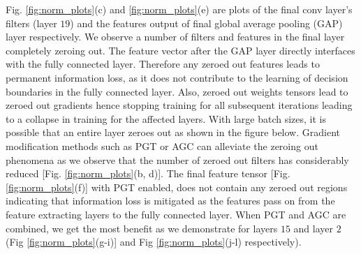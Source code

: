 \documentclass[runningheads]{llncs}
\begin{document}
Fig. \ref{fig:norm_plots}(c) and \ref{fig:norm_plots}(e) are plots of the final conv
layer's filters (layer $19$) and the features output of final global average pooling
(GAP) layer respectively. We observe a number of filters and features in the final layer
completely zeroing out. The feature vector after the GAP layer directly interfaces with
the fully connected layer. Therefore any zeroed out features leads to permanent
information loss, as it does not contribute to the learning of decision boundaries in
the fully connected layer. Also, zeroed out weights tensors lead to zeroed out gradients
hence stopping training for all subsequent iterations leading to a collapse in training
for the affected layers. With large batch sizes, it is possible that an entire layer
zeroes out as shown in the figure below. Gradient modification methods such as PGT or
AGC can alleviate the zeroing out phenomena as we observe that the number of zeroed out
filters has considerably reduced [Fig. \ref{fig:norm_plots}(b, d)]. The final feature
tensor [Fig. \ref{fig:norm_plots}(f)] with PGT enabled, does not contain any zeroed out
regions indicating that information loss is mitigated as the features pass on from the
feature extracting layers to the fully connected layer. When PGT and AGC are combined,
we get the most benefit as we demonstrate for layers $15$ and layer $2$ (Fig
\ref{fig:norm_plots}(g-i)] and Fig \ref{fig:norm_plots}(j-l) respectively).
\end{document}
